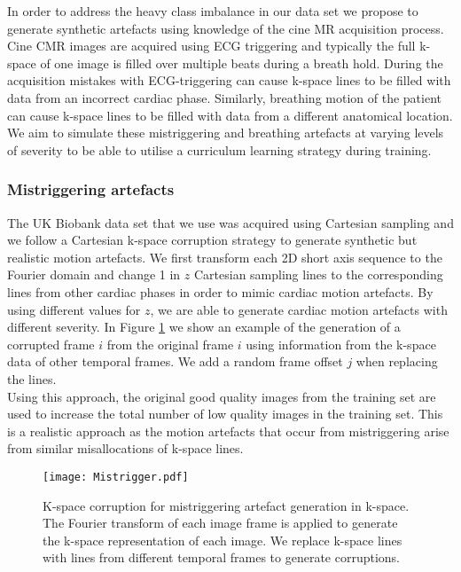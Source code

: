 \documentclass[preprint,12pt,authoryear]{elsarticle}
\begin{document}
In order to address the heavy class imbalance in our data set we propose to generate synthetic artefacts using knowledge of the cine MR acquisition process. Cine CMR images are acquired using ECG triggering and typically the full k-space of one image is filled over multiple beats during a breath hold. During the acquisition mistakes with ECG-triggering can cause k-space lines to be filled with data from an incorrect cardiac phase. Similarly, breathing motion of the patient can cause k-space lines to be filled with data from a different anatomical location. We aim to simulate these mistriggering and breathing artefacts at varying levels of severity to be able to utilise a curriculum learning strategy during training.

\subsubsection{Mistriggering artefacts}

The UK Biobank data set that we use was acquired using Cartesian sampling and we follow a Cartesian k-space corruption strategy to generate synthetic but realistic motion artefacts. We first transform each 2D short axis sequence to the Fourier domain and change 1 in $z$ Cartesian sampling lines to the corresponding lines from other cardiac phases in order to mimic cardiac motion artefacts. By using different values for $z$, we are able to generate cardiac motion artefacts with different severity. In Figure \ref{fig:Kspacemistrigg} we show an example of the generation of a corrupted frame $i$ from the original frame $i$ using information from the k-space data of other temporal frames. We add a random frame offset $j$ when replacing the lines.\\

Using this approach, the original good quality images from the training set are used to increase the total number of  low quality images in the training set. This is a realistic approach as the motion artefacts that occur from mistriggering arise from similar misallocations of k-space lines.


 \begin{figure}[tb]
  \centering
  \centerline{\texttt{[image: Mistrigger.pdf]}}
\caption{K-space corruption for mistriggering artefact generation in k-space. The Fourier transform of each image frame is applied to generate the k-space representation of each image. We replace k-space lines with lines from different temporal frames to generate corruptions. }
\label{fig:Kspacemistrigg}
\end{figure}
\end{document}
